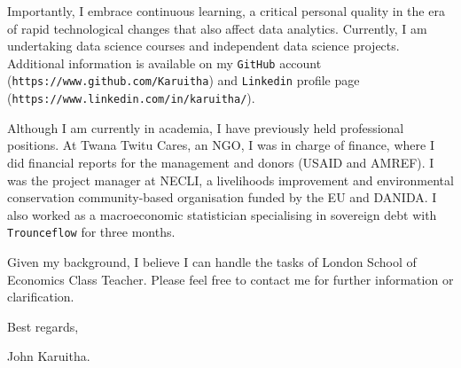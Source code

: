 \documentclass[
  12pt,
]{article}
\begin{document}
Importantly, I embrace continuous learning, a critical personal quality
in the era of rapid technological changes that also affect data
analytics. Currently, I am undertaking data science courses and
independent data science projects. Additional information is available
on my \texttt{GitHub} account (\texttt{https://www.github.com/Karuitha})
and \texttt{Linkedin} profile page
(\texttt{https://www.linkedin.com/in/karuitha/}).

Although I am currently in academia, I have previously held professional
positions. At Twana Twitu Cares, an NGO, I was in charge of finance,
where I did financial reports for the management and donors (USAID and
AMREF). I was the project manager at NECLI, a livelihoods improvement
and environmental conservation community-based organisation funded by
the EU and DANIDA. I also worked as a macroeconomic statistician
specialising in sovereign debt with \texttt{Trounceflow} for three
months.

Given my background, I believe I can handle the tasks of London School
of Economics Class Teacher. Please feel free to contact me for further
information or clarification.

Best regards,

John Karuitha.
\end{document}
